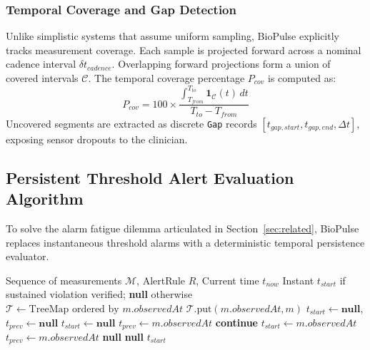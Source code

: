 \documentclass[10pt,journal,compsoc]{IEEEtran}
\begin{document}
\subsubsection{Temporal Coverage and Gap Detection}
Unlike simplistic systems that assume uniform sampling, BioPulse explicitly tracks measurement coverage. Each sample is projected forward across a nominal cadence interval $\delta t_{cadence}$. Overlapping forward projections form a union of covered intervals $\mathcal{C}$. The temporal coverage percentage $P_{cov}$ is computed as:
\begin{equation}
P_{cov} = 100 \times \frac{\int_{T_{from}}^{T_{to}} \mathbf{1}_{\mathcal{C}}(t) \, dt}{T_{to} - T_{from}}
\end{equation}
Uncovered segments are extracted as discrete \texttt{Gap} records $[t_{gap, start}, t_{gap, end}, \Delta t]$, exposing sensor dropouts to the clinician.

\subsection{Persistent Threshold Alert Evaluation Algorithm}
To solve the alarm fatigue dilemma articulated in Section~\ref{sec:related}, BioPulse replaces instantaneous threshold alarms with a deterministic temporal persistence evaluator.

\begin{algorithm}[!t]
\caption{Persistent Temporal Threshold Alert Evaluation}
\label{alg:alert_eval}
\begin{algorithmic}[1]
\REQUIRE Sequence of measurements $\mathcal{M}$, AlertRule $R$, Current time $t_{now}$
\ENSURE Instant $t_{start}$ if sustained violation verified; \textbf{null} otherwise
\STATE $\mathcal{T} \leftarrow \text{TreeMap ordered by } m.observedAt$
    \STATE $\mathcal{T}.\text{put}(m.observedAt, m)$
\ENDFOR
\STATE $t_{start} \leftarrow \textbf{null}$, $t_{prev} \leftarrow \textbf{null}$
        \STATE $t_{start} \leftarrow \textbf{null}$
        \STATE $t_{prev} \leftarrow m.observedAt$
        \STATE \textbf{continue}
    \ENDIF
        \STATE $t_{start} \leftarrow m.observedAt$
    \ENDIF
    \STATE $t_{prev} \leftarrow m.observedAt$
\ENDFOR
{}
    \RETURN \textbf{null}
\ENDIF
{}
    \RETURN \textbf{null}
\ENDIF
\RETURN $t_{start}$
\end{algorithmic}
\end{algorithm}
\end{document}
